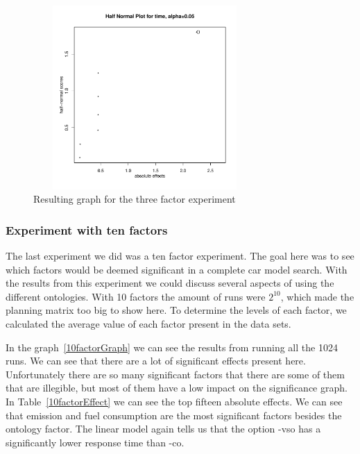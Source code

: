 \documentclass{llncs}
\begin{document}
\begin{figure}
 \includegraphics[width=8.5cm, height=7cm]{2factorfinal.pdf}
  \caption{Resulting graph for the three factor experiment}\label{3factorGraph}
\end{figure}


\subsubsection{Experiment with ten factors}
The last experiment we did was a ten factor experiment. The goal here
was to see which factors would be deemed significant in a complete car
model search. With the results from this experiment we could discuss
several aspects of using the different ontologies.  
With 10 factors the amount of
runs were $2^{10}$, which made the planning matrix too big to show here. 
To determine the levels of each factor, we calculated the average value 
of each factor present in the data sets. 

In the graph~\ref{10factorGraph} we can see the results from running
all the 1024 runs.  We can see that there are a lot of significant
effects present here. 
Unfortunately there are so many significant factors that there are
some of them that are illegible, but most of them have a low impact on
the significance graph.  In Table~\ref{10factorEffect} we can see the top
fifteen absolute effects. We can see that emission and fuel consumption are 
the most significant factors besides the ontology factor.
The linear model again tells us that the option
\textsf{-vso} has a significantly lower response time than
\textsf{-co}. 
\end{document}
